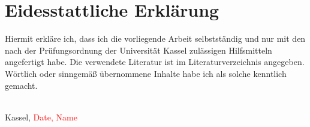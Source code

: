 \section*{Eidesstattliche Erklärung}

Hiermit erkläre ich, dass ich die vorliegende Arbeit selbstständig und nur mit den nach der Prüfungsordnung der Universität Kassel zulässigen Hilfsmitteln angefertigt habe.
Die verwendete Literatur ist im Literaturverzeichnis angegeben.
Wörtlich oder sinngemäß übernommene Inhalte habe ich als solche kenntlich gemacht.

\vspace{1cm}



\begin{flushright}
  \underline{\hspace{7cm}} \\
  Kassel, \textcolor{red}{Date, Name}
\end{flushright}